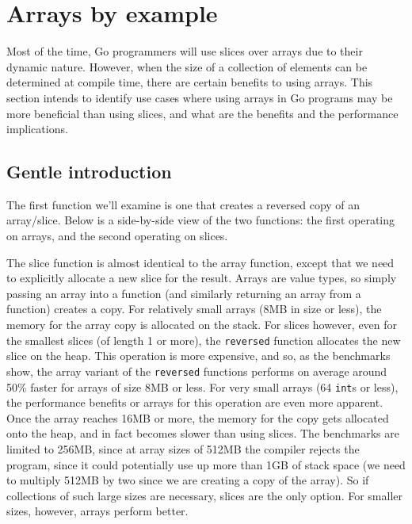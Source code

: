 \section{Arrays by example}

Most of the time, Go programmers will use slices over arrays due to their
dynamic nature. However, when the size of a collection of elements can be
determined at compile time, there are certain benefits to using arrays. This
section intends to identify use cases where using arrays in Go programs may be
more beneficial than using slices, and what are the benefits and the performance
implications.

\subsection{Gentle introduction}

The first function we'll examine is one that creates a reversed copy of an
array/slice. Below is a side-by-side view of the two functions: the first
operating on arrays, and the second operating on slices.


The slice function is almost identical to the array function, except that we
need to explicitly allocate a new slice for the result. Arrays are value types,
so simply passing an array into a function (and similarly returning an array
from a function) creates a copy. For relatively small arrays (8MB in size or
less), the memory for the array copy is allocated on the stack. For slices
however, even for the smallest slices (of length 1 or more), the
\texttt{reversed} function allocates the new slice on the heap. This operation
is more expensive, and so, as the benchmarks show, the array variant of the
\texttt{reversed} functions performs on average around 50\% faster for arrays of
size 8MB or less. For very small arrays (64 \texttt{int}s or less), the
performance benefits or arrays for this operation are even more apparent. Once
the array reaches 16MB or more, the memory for the copy gets allocated onto the
heap, and in fact becomes slower than using slices. The benchmarks are limited
to 256MB, since at array sizes of 512MB the compiler rejects the program, since
it could potentially use up more than 1GB of stack space (we need to multiply
512MB by two since we are creating a copy of the array). So if collections of
such large sizes are necessary, slices are the only option. For smaller sizes,
however, arrays perform better.

